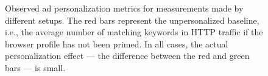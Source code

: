 \documentclass{standalonefigure}
\begin{document}
	
	
	\begin{figure}
		\hfill
		\caption{
			Observed ad personalization metrics for measurements made by different setups. The red bars represent the unpersonalized baseline, i.e., the average number of matching keywords in HTTP traffic if the browser profile has not been primed.
			In all cases, the actual personalization effect --- the difference between the red and green bars --- is small. 
		}
		\label{fig/results-automated-region}
	\end{figure}
	
\end{document}
